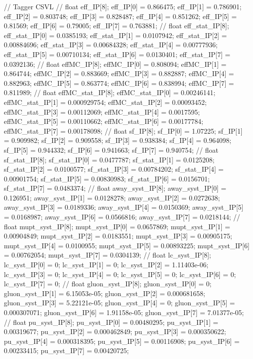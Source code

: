 // Tagger CSVL
// float eff_IP[8];
eff_IP[0] = 0.866475; eff_IP[1] = 0.786901; eff_IP[2] = 0.803748; 
eff_IP[3] = 0.828487; eff_IP[4] = 0.851262; eff_IP[5] = 0.81569; 
eff_IP[6] = 0.79005; eff_IP[7] = 0.763881; 
// float eff_stat_IP[8];
eff_stat_IP[0] = 0.0385193; eff_stat_IP[1] = 0.0107942; eff_stat_IP[2] = 0.00884696; 
eff_stat_IP[3] = 0.00684328; eff_stat_IP[4] = 0.00777936; eff_stat_IP[5] = 0.00710134; 
eff_stat_IP[6] = 0.0130401; eff_stat_IP[7] = 0.0392136; 
// float effMC_IP[8];
effMC_IP[0] = 0.808094; effMC_IP[1] = 0.864744; effMC_IP[2] = 0.883669; 
effMC_IP[3] = 0.882887; effMC_IP[4] = 0.882963; effMC_IP[5] = 0.863774; 
effMC_IP[6] = 0.838994; effMC_IP[7] = 0.811989; 
// float effMC_stat_IP[8];
effMC_stat_IP[0] = 0.00246141; effMC_stat_IP[1] = 0.000929754; effMC_stat_IP[2] = 0.00093452; 
effMC_stat_IP[3] = 0.00112069; effMC_stat_IP[4] = 0.0017595; effMC_stat_IP[5] = 0.00110662; 
effMC_stat_IP[6] = 0.00177784; effMC_stat_IP[7] = 0.00178098; 
// float sf_IP[8];
sf_IP[0] = 1.07225; sf_IP[1] = 0.909982; sf_IP[2] = 0.909558; 
sf_IP[3] = 0.938384; sf_IP[4] = 0.964098; sf_IP[5] = 0.944332; 
sf_IP[6] = 0.941663; sf_IP[7] = 0.940754; 
// float sf_stat_IP[8];
sf_stat_IP[0] = 0.0477787; sf_stat_IP[1] = 0.0125208; sf_stat_IP[2] = 0.0100577; 
sf_stat_IP[3] = 0.00784202; sf_stat_IP[4] = 0.00901754; sf_stat_IP[5] = 0.00830983; 
sf_stat_IP[6] = 0.0156701; sf_stat_IP[7] = 0.0483374; 
// float away_syst_IP[8];
away_syst_IP[0] = 0.126951; away_syst_IP[1] = 0.0128278; away_syst_IP[2] = 0.0272638; 
away_syst_IP[3] = 0.0189336; away_syst_IP[4] = 0.0150369; away_syst_IP[5] = 0.0168987; 
away_syst_IP[6] = 0.0566816; away_syst_IP[7] = 0.0218144; 
// float mupt_syst_IP[8];
mupt_syst_IP[0] = 0.0657869; mupt_syst_IP[1] = 0.00904849; mupt_syst_IP[2] = 0.0183551; 
mupt_syst_IP[3] = 0.00905175; mupt_syst_IP[4] = 0.0100955; mupt_syst_IP[5] = 0.00893225; 
mupt_syst_IP[6] = 0.00762054; mupt_syst_IP[7] = 0.0304139; 
// float lc_syst_IP[8];
lc_syst_IP[0] = 0; lc_syst_IP[1] = 0; lc_syst_IP[2] = 1.11403e-06; 
lc_syst_IP[3] = 0; lc_syst_IP[4] = 0; lc_syst_IP[5] = 0; 
lc_syst_IP[6] = 0; lc_syst_IP[7] = 0; 
// float gluon_syst_IP[8];
gluon_syst_IP[0] = 0; gluon_syst_IP[1] = 6.15053e-05; gluon_syst_IP[2] = 0.000681658; 
gluon_syst_IP[3] = 5.22121e-05; gluon_syst_IP[4] = 0; gluon_syst_IP[5] = 0.000307071; 
gluon_syst_IP[6] = 1.91158e-05; gluon_syst_IP[7] = 7.01377e-05; 
// float pu_syst_IP[8];
pu_syst_IP[0] = 0.00480295; pu_syst_IP[1] = 0.00319677; pu_syst_IP[2] = 0.000462849; 
pu_syst_IP[3] = 0.000350622; pu_syst_IP[4] = 0.000318395; pu_syst_IP[5] = 0.00116908; 
pu_syst_IP[6] = 0.00233415; pu_syst_IP[7] = 0.00420725; 
